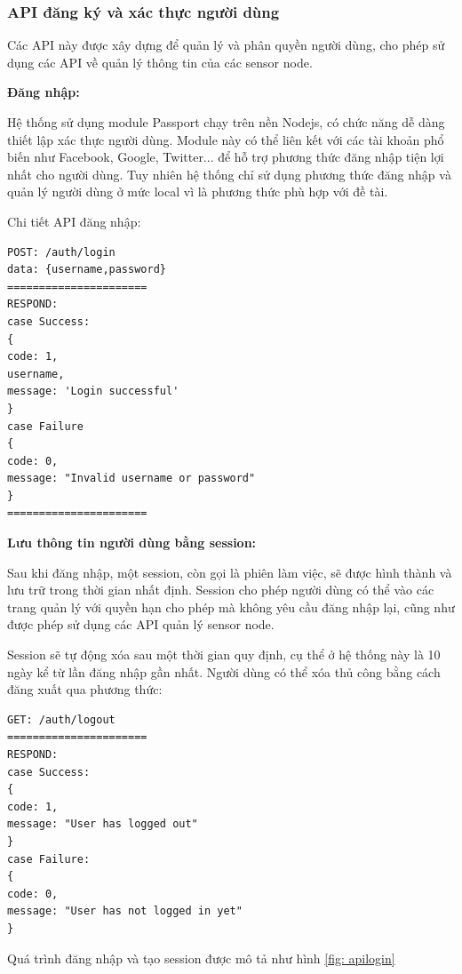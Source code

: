 \subsubsection*{API đăng ký và xác thực người dùng}

Các API này được xây dựng để quản lý và phân quyền người dùng, cho phép sử dụng các API về quản lý thông tin của các sensor node.

\textbf{Đăng nhập:}

Hệ thống sử dụng module Passport chạy trên nền Nodejs, có chức năng dễ dàng thiết lập xác thực người dùng. Module này có thể liên kết với các tài khoản phổ biến như Facebook, Google, Twitter... để hỗ trợ phương thức đăng nhập tiện lợi nhất cho người dùng. Tuy nhiên hệ thống chỉ sử dụng phương thức đăng nhập và quản lý người dùng ở mức local vì là phương thức phù hợp với đề tài.

Chi tiết API đăng nhập:
\begin{Verbatim}[xleftmargin=2em]
POST: /auth/login
data: {username,password}
======================
RESPOND:
case Success:
{
code: 1,
username,
message: 'Login successful'
}
case Failure	
{
code: 0,
message: "Invalid username or password"
}
======================
\end{Verbatim}

\textbf{Lưu thông tin người dùng bằng session:}

Sau khi đăng nhập, một session, còn gọi là phiên làm việc, sẽ được hình thành và lưu trữ trong thời gian nhất định. Session cho phép người dùng có thể vào các trang quản lý với quyền hạn cho phép mà không yêu cầu đăng nhập lại, cũng như được phép sử dụng các API quản lý sensor node.

Session sẽ tự động xóa sau một thời gian quy định, cụ thể ở hệ thống này là 10 ngày kể từ lần đăng nhập gần nhất. Người dùng có thể xóa thủ công bằng cách đăng xuất qua phương thức:
\begin{Verbatim}[xleftmargin=2em]
GET: /auth/logout
======================
RESPOND:
case Success:
{
code: 1,
message: "User has logged out"
}
case Failure:	
{
code: 0,
message: "User has not logged in yet"
}	
\end{Verbatim}

Quá trình đăng nhập và tạo session được mô tả như hình \ref{fig: apilogin}

